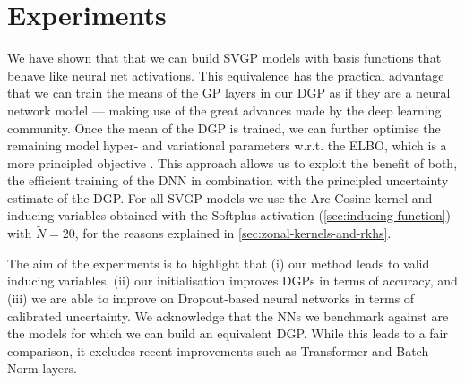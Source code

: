 \section{Experiments}
\label{section:dnn-for-dgps:experiments}

We have shown that that we can build SVGP models with basis functions that behave like neural net activations. This equivalence has the practical advantage that we can train the means of the GP layers in our DGP as if they are a neural network model --- making use of the great advances made by the deep learning community. Once the mean of the DGP is trained, we can further optimise the remaining model hyper- and variational parameters w.r.t. the ELBO, which is a more principled objective \citep{Fong2019On}. This approach allows us to exploit the benefit of both, the efficient training of the DNN in combination with the principled uncertainty estimate of the DGP. For all SVGP models we use the Arc Cosine kernel and inducing variables obtained with the Softplus activation (\cref{sec:inducing-function}) with $\tilde{N} = 20$, for the reasons explained in \cref{sec:zonal-kernels-and-rkhs}.

The aim of the experiments is to highlight that (i) our method leads to valid inducing variables, (ii) our initialisation improves DGPs in terms of accuracy, and (iii) we are able to improve on Dropout-based \citep{Gal2016dropout} neural networks in terms of calibrated uncertainty. 
We acknowledge that the NNs we benchmark against are the models for which we can build an equivalent DGP. While this leads to a fair comparison, it excludes recent improvements such as Transformer and Batch Norm layers.




